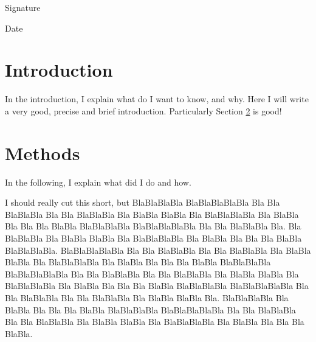 \documentclass[11pt,twoside]{article}
\numberwithin{Theorem}{section}
\numberwithin{Definition}{section}
\numberwithin{Lemma}{section}
\numberwithin{Algorithm}{section}
\numberwithin{equation}{section}
\newcommand{\dottedline}[1]{\makebox[#1]{.\dotfill}}
\begin{document}
Signature \dottedline{8cm}

\vspace{5mm}

Date \dottedline{8cm}


\clearpage



\pagestyle{plain}
\setcounter{page}{1}

\tableofcontents
\clearpage
\listoftables
\listoffigures
\cleardoublepage

\setcounter{page}{1}

\nocite{*}

\clearpage

\section{Introduction}
\label{sec:intro}
In the introduction, I explain what do I want to know, and why.
Here I will write a very good, precise and brief introduction.
Particularly Section \ref{sec:methods} is good!
\clearpage

\section{Methods}
\label{sec:methods}

In the following, I explain what did I do and how.

I should really cut this short, but BlaBlaBlaBla BlaBlaBlaBlaBla Bla Bla BlaBlaBla Bla Bla BlaBlaBla Bla BlaBla BlaBla Bla BlaBlaBlaBla Bla BlaBla Bla Bla Bla BlaBla BlaBlaBlaBla BlaBlaBlaBlaBla Bla Bla BlaBlaBla Bla. Bla BlaBlaBla Bla BlaBla BlaBla Bla BlaBlaBlaBla Bla BlaBla Bla Bla Bla BlaBla BlaBlaBlaBla. BlaBlaBlaBlaBla Bla Bla BlaBlaBla Bla Bla BlaBlaBla Bla BlaBla BlaBla Bla BlaBlaBlaBla Bla BlaBla Bla Bla Bla BlaBla BlaBlaBlaBla BlaBlaBlaBlaBla Bla Bla BlaBlaBla Bla Bla BlaBlaBla Bla BlaBla BlaBla Bla BlaBlaBlaBla Bla BlaBla Bla Bla Bla BlaBla BlaBlaBlaBla BlaBlaBlaBlaBla Bla Bla BlaBlaBla Bla Bla BlaBlaBla Bla BlaBla BlaBla Bla. BlaBlaBlaBla Bla BlaBla Bla Bla Bla BlaBla BlaBlaBlaBla BlaBlaBlaBlaBla Bla Bla BlaBlaBla Bla Bla BlaBlaBla Bla BlaBla BlaBla Bla BlaBlaBlaBla Bla BlaBla Bla Bla Bla BlaBla.
\end{document}
